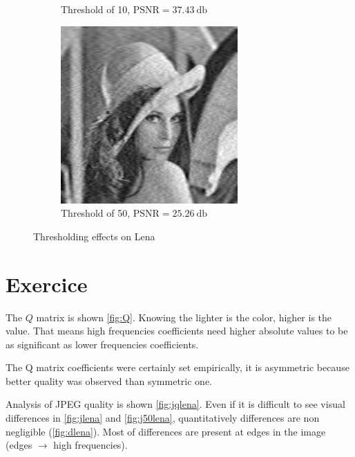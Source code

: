 \documentclass[12pt,english]{article}
\renewcommand{\thesection}{Exercice~\arabic{section}}
\begin{document}
\begin{figure}
\begin{subfigure}[t]{0.3\textwidth}
		\caption{Threshold of 10, $\text{PSNR}=\SI{37.43}{\decibel}$}
		\label{fig:lzna10}
	\end{subfigure}
	\quad%
	\begin{subfigure}[t]{0.3\textwidth}
		\centering
		\includegraphics[width=.9\textwidth]{img/lena_new_t50}
		\caption{Threshold of 50, $\text{PSNR}=\SI{25.26}{\decibel}$}
		\label{fig:lena50}
	\end{subfigure}
	\caption{Thresholding effects on Lena}
	\label{fig:tlena}
\end{figure}

\section[]{\thesection}
The $Q$ matrix is shown \autoref{fig:Q}. Knowing the lighter is the color, higher is the value. That means high frequencies coefficients need higher absolute values to be as significant as lower frequencies coefficients.

The Q matrix coefficients were certainly set empirically, it is asymmetric because better quality was observed than symmetric one.

Analysis of JPEG quality is shown \autoref{fig:jqlena}. Even if it is difficult to see visual differences in \autoref{fig:jlena} and \ref{fig:j50lena}, quantitatively differences are non negligible (\autoref{fig:dlena}). Most of differences are present at edges in the image (edges $\to$ high frequencies).
\end{document}
